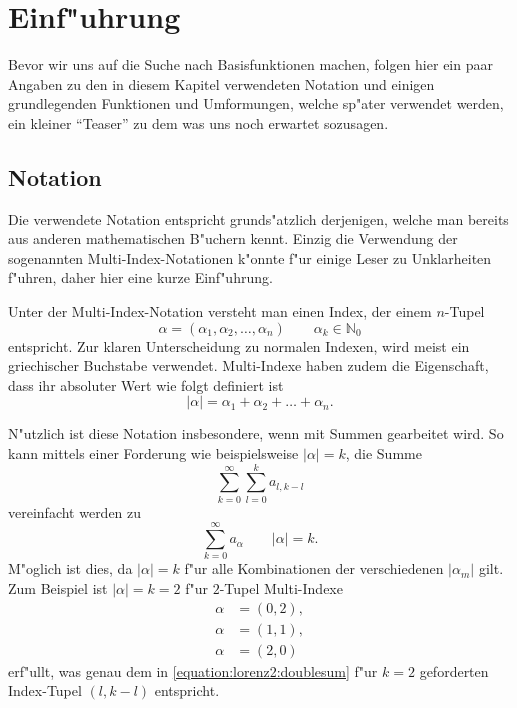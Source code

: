 \section{Einf"uhrung}

Bevor wir uns auf die Suche nach Basisfunktionen machen, folgen hier ein paar 
Angaben zu den in diesem Kapitel verwendeten Notation und einigen grundlegenden 
Funktionen und Umformungen, welche sp"ater verwendet werden, ein kleiner 
``Teaser'' zu dem was uns noch erwartet sozusagen.

\subsection{Notation}
Die verwendete Notation entspricht grunds"atzlich derjenigen, welche man 
bereits aus anderen mathematischen B"uchern kennt. Einzig die Verwendung der 
sogenannten Multi-Index-Notationen k"onnte f"ur einige Leser zu Unklarheiten 
f"uhren, daher hier eine kurze Einf"uhrung.

Unter der Multi-Index-Notation versteht man einen Index, der einem 
$n$-Tupel
\begin{equation*}
	\alpha = (\alpha_1, \alpha_2, \dotsc, \alpha_n) \qquad \alpha_k \in 
	\mathbb{N}_{0}
\end{equation*}
entspricht. Zur klaren Unterscheidung zu normalen Indexen, wird meist ein 
griechischer Buchstabe verwendet. Multi-Indexe haben zudem die Eigenschaft, 
dass ihr absoluter Wert wie folgt definiert ist
\begin{equation*}
	|\alpha| = \alpha_1 + \alpha_2 + \dots + \alpha_n.
\end{equation*}
 
N"utzlich ist diese Notation insbesondere, wenn mit Summen gearbeitet wird. So 
kann mittels einer Forderung wie beispielsweise $|\alpha| = k$, die Summe
\begin{equation}
	\sum_{k = 0}^{\infty}\sum_{l = 0}^{k}a_{l, k - l}
	\label{equation:lorenz2:doublesum}
\end{equation}
vereinfacht werden zu
\begin{equation}
	\sum_{k = 0}^{\infty}a_{\alpha} \qquad |\alpha| = k.
	\label{equation:lorenz2:mmsum}
\end{equation}
M"oglich ist dies, da $|\alpha| = k$ f"ur alle Kombinationen der verschiedenen 
$|\alpha_m|$ gilt. Zum Beispiel ist $|\alpha| = k = 2$ f"ur $2$-Tupel 
Multi-Indexe
\begin{align*}
	\alpha &= (0, 2), \\
	\alpha &= (1, 1), \\
	\alpha &= (2, 0)
\end{align*}
erf"ullt, was genau dem in \cref{equation:lorenz2:doublesum} f"ur $k = 2$ 
geforderten Index-Tupel $(l, k - l)$ entspricht.

